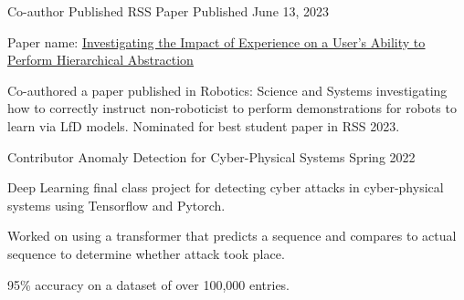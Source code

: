 
\begin{cventries}

  \cventry
      {Co-author} %
      {Published RSS Paper} %
      {} %
      {Published June 13, 2023} %
      {
        \begin{cvitems} %
          \item Paper name: \textcolor{awesome}{\underline{\href{https://openreview.net/forum?id=kXy0HAnah0-}{Investigating the Impact of Experience on a User's Ability to Perform Hierarchical Abstraction}}}
          \item Co-authored a paper published in Robotics: Science and Systems investigating how to correctly instruct non-roboticist to perform demonstrations for robots to learn via LfD models. Nominated for best student paper in RSS 2023.
        \end{cvitems}
      }

  \cventry
      {Contributor} %
      {Anomaly Detection for Cyber-Physical Systems} %
      {} %
      {Spring 2022} %
      {
        \begin{cvitems} %
          \item {Deep Learning final class project for detecting cyber attacks in cyber-physical systems using Tensorflow and Pytorch.}
          \item {Worked on using a transformer that predicts a sequence and compares to actual sequence to determine whether attack took place.}
          \item {95\% accuracy on a dataset of over 100,000 entries.}
        \end{cvitems}
      }


\end{cventries}